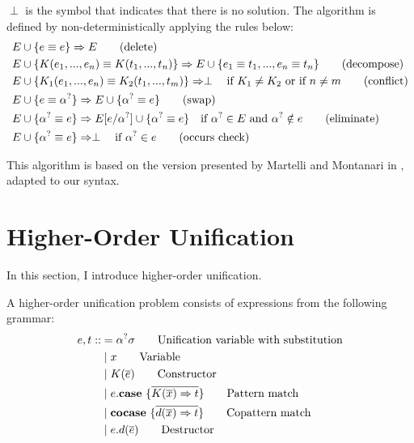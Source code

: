 \documentclass[twoside,12pt,a4paper]{article}
\begin{document}
\begin{definition}
    $\perp$ is the symbol that indicates that there is no solution.
    The algorithm is defined by non-deterministically applying the rules below:
    \begin{align*}
        E & \cup \{ e \equiv e\} \Rightarrow E \tag{delete}\\
        E & \cup \{K(e_1, ..., e_n) \equiv K(t_1, ..., t_n)\} \Rightarrow E \cup \{e_1 \equiv t_1, ..., e_n \equiv t_n\}\tag{decompose}\\
        E & \cup \{K_1(e_1,..., e_n) \equiv K_2(t_1, ..., t_m)\}  \Rightarrow \perp \quad\text{if $K_1 \neq K_2$ or if $n\neq m$} \tag{conflict}\\
        E & \cup \{e \equiv \alpha^?\} \Rightarrow E \cup \{\alpha^? \equiv e\}\tag{swap}\\ 
        E & \cup \{\alpha^? \equiv e\} \Rightarrow E[e/\alpha^?] \cup \{\alpha^? \equiv e\} \quad\text{if $\alpha^? \in E$ and $\alpha^? \notin e$}  \tag{eliminate}\\
        E & \cup \{\alpha^? \equiv e\}\Rightarrow \perp \quad \text{if $\alpha^? \in e$} \tag{occurs check} \label{a}
    \end{align*}
\end{definition}

This algorithm is based on the version presented by Martelli and Montanari in \cite{10.1145/357162.357169},
adapted to our syntax.
\section{Higher-Order Unification}\label{sec:Higher-Order Unification}

In this section, I introduce higher-order unification.

\begin{definition}
    A higher-order unification problem consists of expressions from the following grammar:
    \begin{align*}
        e,t  ::&= \alpha^?\sigma \tag*{Unification variable with substitution}\\ 
            &\;|\; x  \tag*{Variable} \\
            &\;|\;K(\overline{e}) \tag*{Constructor} \\
            &\;|\;e.\textbf{case}\ \{\overline{K(\overline{x})\Rightarrow t}\}  \tag*{Pattern match}\\
            &\;|\;\textbf{cocase}\ \{\overline{d(\overline{x})\Rightarrow t}\}  \tag*{Copattern match}\\
            &\;|\;e.d(\overline{e})  \tag*{Destructor}
    \end{align*}
\end{definition}
\end{document}
